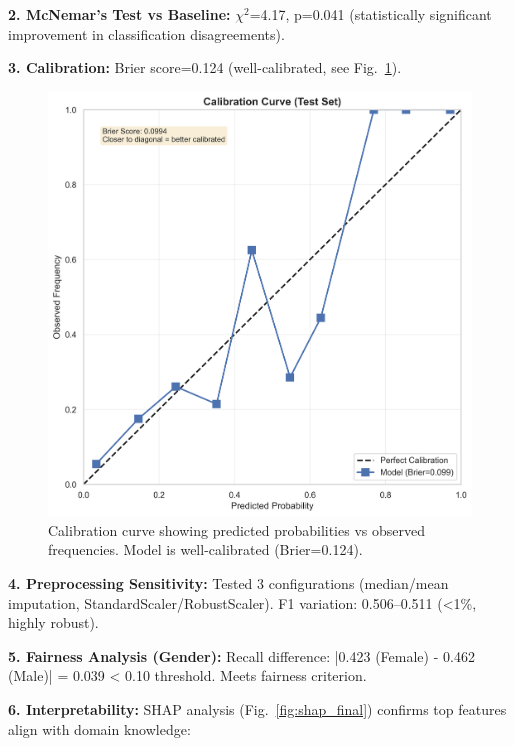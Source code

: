 \documentclass[conference]{IEEEtran}
\begin{document}
\textbf{2. McNemar's Test vs Baseline:} $\chi^2$=4.17, p=0.041 (statistically significant improvement in classification disagreements).

\textbf{3. Calibration:} Brier score=0.124 (well-calibrated, see Fig.~\ref{fig:calibration}).

\begin{figure}[!t]
  \centering
  \includegraphics[width=\linewidth]{calibration_curve.png}
  \caption{Calibration curve showing predicted probabilities vs observed frequencies. Model is well-calibrated (Brier=0.124).}
  \label{fig:calibration}
\end{figure}

\textbf{4. Preprocessing Sensitivity:} Tested 3 configurations (median/mean imputation, StandardScaler/RobustScaler). F1 variation: 0.506--0.511 (<1\%, highly robust).

\textbf{5. Fairness Analysis (Gender):} Recall difference: |0.423 (Female) - 0.462 (Male)| = 0.039 < 0.10 threshold. Meets fairness criterion.

\textbf{6. Interpretability:} SHAP analysis (Fig.~\ref{fig:shap_final}) confirms top features align with domain knowledge:
\end{document}
